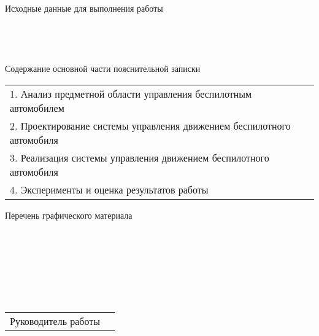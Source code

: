 
\noindent
Исходные данные для выполнения работы \\
\underline{\hspace{\linewidth}} \\
\underline{\hspace{\linewidth}} \\
\underline{\hspace{\linewidth}} \\
\underline{\hspace{\linewidth}} \\

\noindent
Содержание основной части пояснительной записки \\
\renewcommand{\arraystretch}{1}
\begin{tabularx}{\linewidth}{X}
    1. Анализ предметной области управления беспилотным автомобилем \\
    2. Проектирование системы управления движением беспилотного автомобиля \\
    3. Реализация системы управления движением беспилотного автомобиля \\
    4. Эксперименты и оценка результатов работы \\
\end{tabularx}

\newpage

\thispagestyle{empty}

\begin{center}
    Перечень графического материала
\end{center}

\noindent
\underline{\hspace{\linewidth}} \\
\underline{\hspace{\linewidth}} \\
\underline{\hspace{\linewidth}} \\
\underline{\hspace{\linewidth}} \\
\underline{\hspace{\linewidth}} \\
\underline{\hspace{\linewidth}} \\

\noindent
\begin{tabularx}{\linewidth}{@{}lP@{}}
    Руководитель работы  & 
\end{tabularx}


